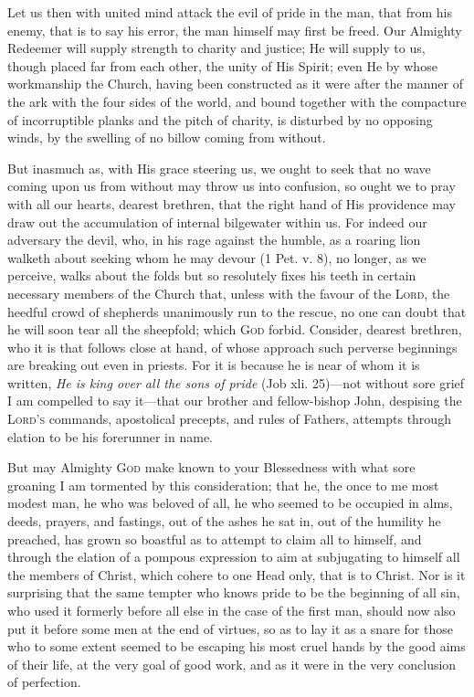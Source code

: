Let us then with united mind attack the evil of pride in the man, that from his enemy, that is to say his error, the man himself may first be freed. Our Almighty Redeemer will supply strength to charity and justice; He will supply to us, though placed far from each other, the unity of His Spirit; even He by whose workmanship the Church, having been constructed as it were after the manner of the ark with the four sides of the world, and bound together with the compacture of incorruptible planks and the pitch of charity, is disturbed by no opposing winds, by the swelling of no billow coming from without.

But inasmuch as, with His grace steering us, we ought to seek that no wave coming upon us from without may throw us into confusion, so ought we to pray with all our hearts, dearest brethren, that the right hand of His providence may draw out the accumulation of internal bilgewater within us. For indeed our adversary the devil, who, in his rage against the humble, as a roaring lion walketh about seeking whom he may devour (1 Pet. v. 8), no longer, as we perceive, walks about the folds but so resolutely fixes his teeth in certain necessary members of the Church that, unless with the favour of the \textsc{Lord}, the heedful crowd of shepherds unanimously run to the rescue, no one can doubt that he will soon tear all the sheepfold; which \textsc{God} forbid. Consider, dearest brethren, who it is that follows close at hand, of whose approach such perverse beginnings are breaking out even in priests. For it is because he is near of whom it is written, \emph{He is king over all the sons of pride} (Job xli. 25)—not without sore grief I am compelled to say it—that our brother and fellow-bishop John, despising the \textsc{Lord’s} commands, apostolical precepts, and rules of Fathers, attempts through elation to be his forerunner in name.

But may Almighty \textsc{God} make known to your Blessedness with what sore groaning I am tormented by this consideration; that he, the once to me most modest man, he who was beloved of all, he who seemed to be occupied in alms, deeds, prayers, and fastings, out of the ashes he sat in, out of the humility he preached, has grown so boastful as to attempt to claim all to himself, and through the elation of a pompous expression to aim at subjugating to himself all the members of Christ, which cohere to one Head only, that is to Christ. Nor is it surprising that the same tempter who knows pride to be the beginning of all sin, who used it formerly before all else in the case of the first man, should now also put it before some men at the end of virtues, so as to lay it as a snare for those who to some extent seemed to be escaping his most cruel hands by the good aims of their life, at the very goal of good work, and as it were in the very conclusion of perfection.

